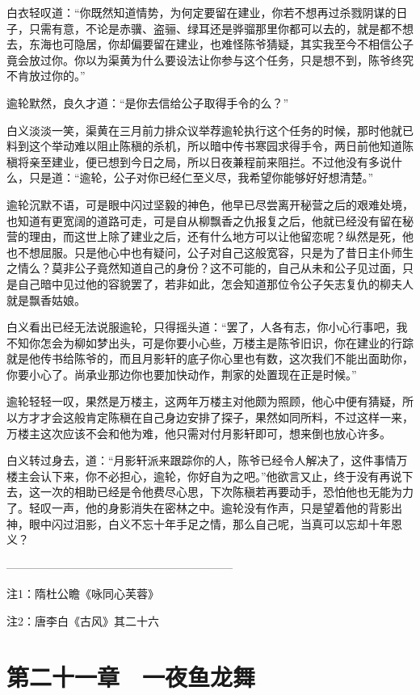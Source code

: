 白衣轻叹道：“你既然知道情势，为何定要留在建业，你若不想再过杀戮阴谋的日子，只需有意，不论是赤骥、盗骊、绿耳还是骅骝那里你都可以去的，就是都不想去，东海也可隐居，你却偏要留在建业，也难怪陈爷猜疑，其实我至今不相信公子竟会放过你。你以为渠黄为什么要设法让你参与这个任务，只是想不到，陈爷终究不肯放过你的。”

逾轮默然，良久才道：“是你去信给公子取得手令的么？”

白义淡淡一笑，渠黄在三月前力排众议举荐逾轮执行这个任务的时候，那时他就已料到这个举动难以阻止陈稹的杀机，所以暗中传书寒园求得手令，两日前他知道陈稹将亲至建业，便已想到今日之局，所以日夜兼程前来阻拦。不过他没有多说什么，只是道：“逾轮，公子对你已经仁至义尽，我希望你能够好好想清楚。”

逾轮沉默不语，可是眼中闪过坚毅的神色，他早已尽尝离开秘营之后的艰难处境，也知道有更宽阔的道路可走，可是自从柳飘香之仇报复之后，他就已经没有留在秘营的理由，而这世上除了建业之后，还有什么地方可以让他留恋呢？纵然是死，他也不想屈服。只是他心中也有疑问，公子对自己这般宽容，只是为了昔日主仆师生之情么？莫非公子竟然知道自己的身份？这不可能的，自己从未和公子见过面，只是自己暗中见过他的容貌罢了，若非如此，怎会知道那位令公子矢志复仇的柳夫人就是飘香姑娘。

白义看出已经无法说服逾轮，只得摇头道：“罢了，人各有志，你小心行事吧，我不知你怎会为柳如梦出头，可是你要小心些，万楼主是陈爷旧识，你在建业的行踪就是他传书给陈爷的，而且月影轩的底子你心里也有数，这次我们不能出面助你，你要小心了。尚承业那边你也要加快动作，荆家的处置现在正是时候。”

逾轮轻轻一叹，果然是万楼主，这两年万楼主对他颇为照顾，他心中便有猜疑，所以方才才会这般肯定陈稹在自己身边安排了探子，果然如同所料，不过这样一来，万楼主这次应该不会和他为难，他只需对付月影轩即可，想来倒也放心许多。

白义转过身去，道：“月影轩派来跟踪你的人，陈爷已经令人解决了，这件事情万楼主会认下来，你不必担心，逾轮，你好自为之吧。”他欲言又止，终于没有再说下去，这一次的相助已经是令他费尽心思，下次陈稹若再要动手，恐怕他也无能为力了。轻叹一声，他的身影消失在密林之中。逾轮没有作声，只是望着他的背影出神，眼中闪过泪影，白义不忘十年手足之情，那么自己呢，当真可以忘却十年恩义？

————————————————————

注1：隋杜公瞻《咏同心芙蓉》

注2：唐李白《古风》其二十六

\chapter{第二十一章　一夜鱼龙舞}

